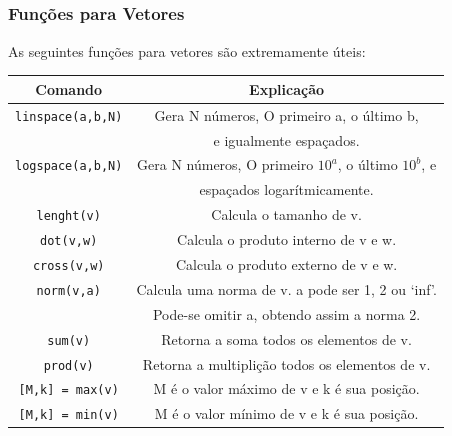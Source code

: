 \documentclass{beamer}
\begin{document}
\subsection[Fun\c{c}\~oes para Vetores]{}
\begin{frame}
\frametitle{Fun\c{c}\~oes para Vetores}

As seguintes fun\c{c}\~oes para vetores s\~ao extremamente \'uteis:
{\scriptsize
\begin{center}
\begin{tabular}{|c|c|}
\hline
Comando & Explica\c{c}\~ao \\ \hline
{\tt linspace(a,b,N)} & Gera N n\'umeros, O primeiro a, o \'ultimo b, \\
& e igualmente espa\c{c}ados. \\ \hline
{\tt logspace(a,b,N)} & Gera N n\'umeros, O primeiro $10^a$, o \'ultimo $10^b$, e\\
& espa\c{c}ados logar\'itmicamente.\\ \hline
{\tt lenght(v)} & Calcula o tamanho de v. \\ \hline
{\tt dot(v,w)} & Calcula o produto interno de v e w. \\ \hline
{\tt cross(v,w)} & Calcula o produto externo de v e w. \\ \hline
{\tt norm(v,a)} & Calcula uma norma de v. a pode ser 1, 2 ou `inf'. \\
& Pode-se omitir a, obtendo assim a norma 2. \\ \hline
{\tt sum(v)} & Retorna a soma todos os elementos de v. \\ \hline
{\tt prod(v)} & Retorna a multipli\c{c}\~ao todos os elementos de v. \\ \hline
{\tt [M,k] = max(v)} & M \'e o valor m\'aximo de v e k \'e sua posi\c{c}\~ao. \\ \hline
{\tt [M,k] = min(v)} & M \'e o valor m\'inimo de v e k \'e sua posi\c{c}\~ao. \\ \hline
\end{tabular}
\end{center}
}
\end{frame}

\subsection[Cria\c{c}\~ao de Matrizes]{}
\end{document}
